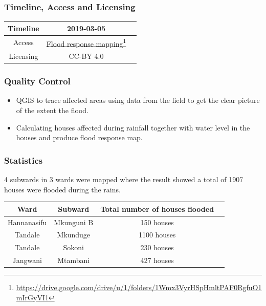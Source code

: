 \documentclass[a4paper,12pt,twoside]{article}
\begin{document}
\subsubsection{Timeline, Access and Licensing}
\begin{center}
\begin{tabular}{|c|c|c|}  
 \hline
  Timeline  &  2019-03-05 \\
\hline  
 Access  & 
   \href{https://drive.google.com/drive/u/1/folders/1Wmx3VyrHSpHmltPAF0RgfuO1mIrGyVI1}{Flood response mapping}\footnote{\url{https://drive.google.com/drive/u/1/folders/1Wmx3VyrHSpHmltPAF0RgfuO1mIrGyVI1}} \\
  
\hline
Licensing   &  CC-BY 4.0 \\
\hline

\end{tabular}
\end{center}

\subsubsection{Quality Control}
\begin{itemize}
    \item QGIS to trace affected areas using data from the field to get the clear picture of the extent the flood. 
   \item Calculating houses affected during rainfall together with  water level in the houses  and produce flood response map.
\end{itemize}

\subsubsection{Statistics}
4 subwards in 3 wards were mapped where the result showed a total of 1907 houses were flooded during the rains.
\begin{center}
\begin{tabular}{|c|c|c|c|}
\hline
Ward & Subward & Total number of houses flooded \\
\hline
Hannanasifu & Mkunguni B & 150 houses \\
\hline
Tandale & Mkunduge & 1100 houses \\
\hline
Tandale & Sokoni & 230 houses \\
\hline
Jangwani & Mtambani & 427 houses \\
\hline
\end{tabular}
\end{center}
\end{document}
